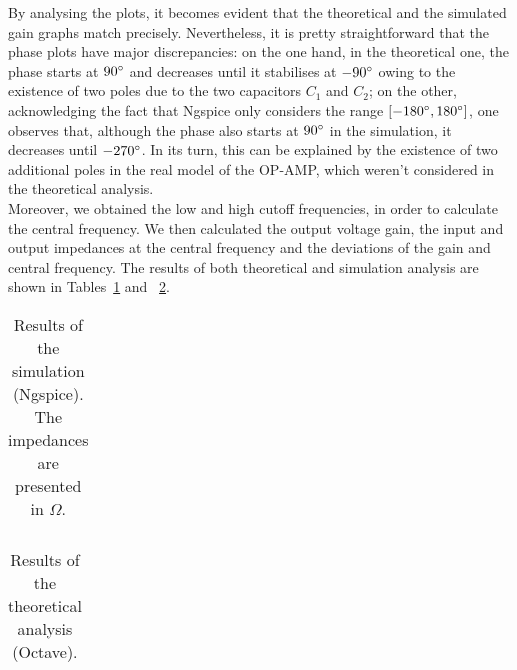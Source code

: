 \vspace{10mm}

By analysing the plots, it becomes evident that the theoretical and the simulated gain graphs match precisely. Nevertheless, it is pretty straightforward that the phase plots have major discrepancies: on the one hand, in the theoretical one, the phase starts at $90\degree$ and decreases until it stabilises at $-90\degree$ owing to the existence of two poles due to the two capacitors $C_1$ and $C_2$; on the other, acknowledging the fact that Ngspice only considers the range $[-180\degree , 180\degree ]$, one observes that, although the phase also starts at $90\degree$ in the simulation, it decreases until $-270\degree$. In its turn, this can be explained by the existence of two additional poles in the real model of the OP-AMP, which weren’t considered in the theoretical analysis.\\

Moreover, we obtained the low and high cutoff frequencies, in order to calculate the central frequency. We then calculated the output voltage gain, the input and output impedances at the central frequency and the deviations of the gain and central frequency. The results of both theoretical and simulation analysis are shown in Tables~\ref{tab:resultsngspice} and ~\ref{tab:resultsoctave}.

\vspace{5mm}

\noindent
\begin{minipage}[c]{0.5\linewidth}

\begin{table}[H]
 \centering
 \begin{tabular}{|l|r|}
 \hline
 
 
 \end{tabular}
 \caption{Results of the simulation (Ngspice). The impedances are presented in $\Omega$.}
 \label{tab:resultsngspice}
 \end{table}
 
\end{minipage}
\begin{minipage}[c]{0.5\linewidth}
 
 \begin{table}[H]
 \centering
 \begin{tabular}{|l|r|}
 \hline
 
 \end{tabular}
 \caption{Results of the theoretical analysis (Octave).}
 \label{tab:resultsoctave}
 \end{table}
 
\end{minipage}

